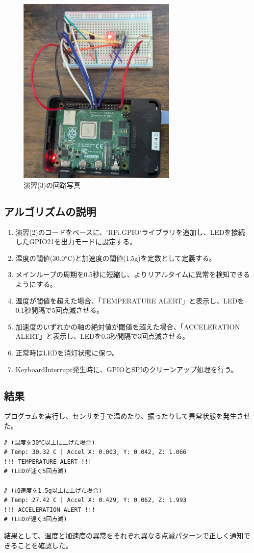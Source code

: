 \documentclass[a4paper,11pt,dvipdfmx]{jsarticle}
\begin{document}
\begin{figure}[H]
    \centering
    \includegraphics[width=0.7\textwidth]{img/9-3.png}
    \caption{演習(3)の回路写真}
    \label{fig:photo3}
\end{figure}

\subsection{アルゴリズムの説明}
\begin{enumerate}
    \item 演習(2)のコードをベースに、`RPi.GPIO`ライブラリを追加し、LEDを接続したGPIO21を出力モードに設定する。
    \item 温度の閾値(30.0°C)と加速度の閾値(1.5g)を定数として定義する。
    \item メインループの周期を0.5秒に短縮し、よりリアルタイムに異常を検知できるようにする。
    \item 温度が閾値を超えた場合、「TEMPERATURE ALERT」と表示し、LEDを0.1秒間隔で5回点滅させる。
    \item 加速度のいずれかの軸の絶対値が閾値を超えた場合、「ACCELERATION ALERT」と表示し、LEDを0.3秒間隔で3回点滅させる。
    \item 正常時はLEDを消灯状態に保つ。
    \item KeyboardInterrupt発生時に、GPIOとSPIのクリーンアップ処理を行う。
\end{enumerate}

\subsection{結果}
プログラムを実行し、センサを手で温めたり、振ったりして異常状態を発生させた。
\begin{verbatim}
# (温度を30℃以上に上げた場合)
# Temp: 30.32 C | Accel X: 0.003, Y: 0.042, Z: 1.066
!!! TEMPERATURE ALERT !!!
# (LEDが速く5回点滅)

# (加速度を1.5g以上に上げた場合)
# Temp: 27.42 C | Accel X: 0.429, Y: 0.062, Z: 1.993
!!! ACCELERATION ALERT !!!
# (LEDが遅く3回点滅)
\end{verbatim}
結果として、温度と加速度の異常をそれぞれ異なる点滅パターンで正しく通知できることを確認した。
\end{document}
